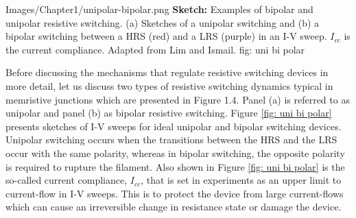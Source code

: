 {Images/Chapter1/unipolar-bipolar.png}
{\textbf{Sketch:} Examples of bipolar and unipolar resistive switching.}
{(a) Sketches of a unipolar switching and (b) a bipolar switching between a HRS (red) and a LRS (purple) in an I-V sweep. $I_{cc}$ is the current compliance. Adapted from Lim and Ismail\cite{lim2015}.}
{fig: uni bi polar}

Before discussing the mechanisms that regulate resistive switching devices in more detail, let us discuss two types of resistive switching dynamics typical in memristive junctions which are presented in Figure 1.4. Panel (a) is referred to as unipolar and panel (b) as bipolar resistive switching\cite{ielmini2015}. Figure \ref{fig: uni bi polar} presents sketches of I-V sweeps for ideal unipolar and bipolar switching devices. Unipolar switching occurs when the transitions between the HRS and the LRS occur with the same polarity, whereas in bipolar switching, the opposite polarity is required to rupture the filament. Also shown in Figure \ref{fig: uni bi polar} is the so-called current compliance, $I_{cc}$, that is set in experiments as an upper limit to current-flow in I-V sweeps. This is to protect the device from large current-flows which can cause an irreversible change in resistance state or damage the device. 

